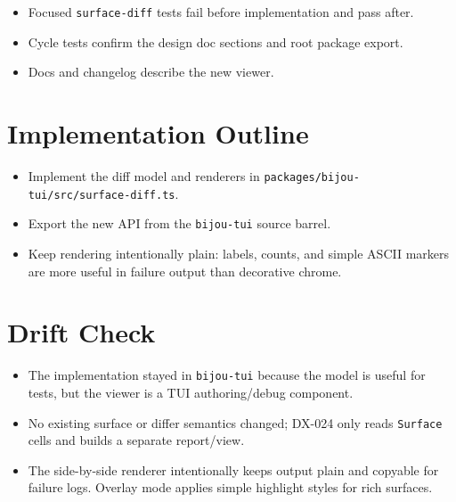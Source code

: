 \begin{itemize}
\tightlist
\item
  Focused \texttt{s\allowbreak{}u\allowbreak{}r\allowbreak{}f\allowbreak{}a\allowbreak{}c\allowbreak{}e\allowbreak{}-\allowbreak{}d\allowbreak{}i\allowbreak{}f\allowbreak{}f} tests fail before implementation and pass after.
\item
  Cycle tests confirm the design doc sections and root package export.
\item
  Docs and changelog describe the new viewer.
\end{itemize}

\section{Implementation Outline}\label{record-124-implementation-outline}

\begin{itemize}
\tightlist
\item
  Implement the diff model and renderers in \texttt{p\allowbreak{}a\allowbreak{}c\allowbreak{}k\allowbreak{}a\allowbreak{}g\allowbreak{}e\allowbreak{}s\allowbreak{}/\allowbreak{}b\allowbreak{}i\allowbreak{}j\allowbreak{}o\allowbreak{}u\allowbreak{}-\allowbreak{}t\allowbreak{}u\allowbreak{}i\allowbreak{}/\allowbreak{}s\allowbreak{}r\allowbreak{}c\allowbreak{}/\allowbreak{}s\allowbreak{}u\allowbreak{}r\allowbreak{}f\allowbreak{}a\allowbreak{}c\allowbreak{}e\allowbreak{}-\allowbreak{}d\allowbreak{}i\allowbreak{}f\allowbreak{}f\allowbreak{}.\allowbreak{}t\allowbreak{}s}.
\item
  Export the new API from the \texttt{b\allowbreak{}i\allowbreak{}j\allowbreak{}o\allowbreak{}u\allowbreak{}-\allowbreak{}t\allowbreak{}u\allowbreak{}i} source barrel.
\item
  Keep rendering intentionally plain: labels, counts, and simple ASCII markers are more useful in failure output than decorative chrome.
\end{itemize}

\section{Drift Check}\label{record-124-drift-check}

\begin{itemize}
\tightlist
\item
  The implementation stayed in \texttt{b\allowbreak{}i\allowbreak{}j\allowbreak{}o\allowbreak{}u\allowbreak{}-\allowbreak{}t\allowbreak{}u\allowbreak{}i} because the model is useful for tests, but the viewer is a TUI authoring/debug component.
\item
  No existing surface or differ semantics changed; DX-024 only reads \texttt{S\allowbreak{}u\allowbreak{}r\allowbreak{}f\allowbreak{}a\allowbreak{}c\allowbreak{}e} cells and builds a separate report/view.
\item
  The side-by-side renderer intentionally keeps output plain and copyable for failure logs. Overlay mode applies simple highlight styles for rich surfaces.
\end{itemize}

